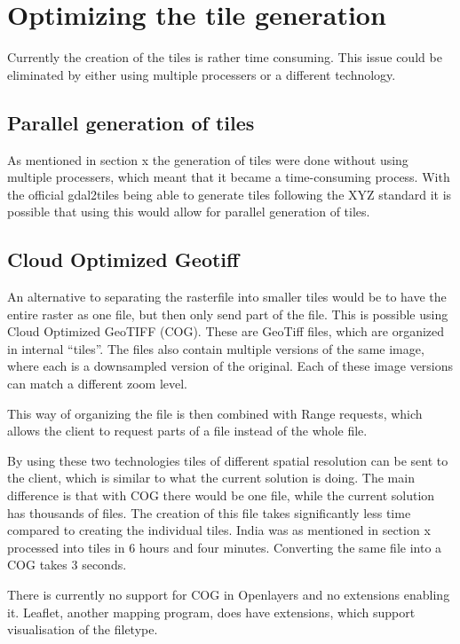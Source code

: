 \section{Optimizing the tile generation}

Currently the creation of the tiles is rather time consuming. This issue could be eliminated by either using multiple processers or a different technology.

\subsection{Parallel generation of tiles}
As mentioned in section x the generation of tiles were done without using multiple processers, which meant that it became a time-consuming process. With the official gdal2tiles being able to generate tiles following the XYZ standard it is possible that using this would allow for parallel generation of tiles. 


\subsection{Cloud Optimized Geotiff}

An alternative to separating the rasterfile into smaller tiles would be to have the entire raster as one file, but then only send part of the file. This is possible using Cloud Optimized GeoTIFF (COG). These are GeoTiff files, which are organized in internal “tiles”.
The files also contain multiple versions of the same image, where each is a downsampled version of the original. Each of these image versions can match a different zoom level.


This way of organizing the file is then combined with Range requests, which allows the client to request parts of a file instead of the whole file. \citep{COGoverview} 

By using these two technologies tiles of different spatial resolution can be sent to the client, which is similar to what the current solution is doing. The main difference is that with COG there would be one file, while the current solution has thousands of files. The creation of this file takes significantly less time compared to creating the individual tiles. India was as mentioned in section x processed into tiles in 6 hours and four minutes. Converting the same file into a COG takes 3 seconds.



There is currently no support for COG in Openlayers and no extensions enabling it. Leaflet, another mapping program, does have extensions, which support visualisation of the filetype.
\citep{COGopenlayers}

 

